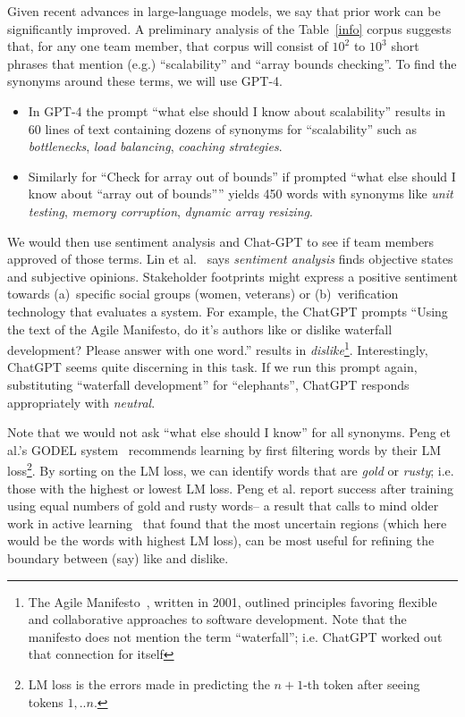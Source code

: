 \documentclass[twoside]{NSF}
\newenvironment{myitemize}
{ \begin{itemize}[topsep=0pt,itemsep=0pt,leftmargin=*]
    \setlength{\itemsep}{0pt}
    \setlength{\parskip}{0pt}
    \setlength{\parsep}{0pt}     }
{ \end{itemize}                  }
\newcommand{\bi}{\begin{myitemize}}
\newcommand{\ei}{\end{myitemize}}
\begin{document}
\begin{nsfdescription}
  Given recent advances in large-language models, we say that prior
work can be significantly improved.  A preliminary analysis of the Table~\ref{info}
corpus suggests that, for any one team member, that corpus will consist of $10^2$
to $10^3$ short phrases that mention (e.g.) ``scalability'' and ``array bounds checking''.
To find the synonyms around these terms, we will use GPT-4.
\bi 
\item In GPT-4 the prompt ``what else should I know about scalability'' results in 60 lines of text containing dozens of
synonyms for ``scalability'' such as {\em bottlenecks}, 
{\em load balancing}, {\em coaching strategies}.
\item 
Similarly for ``Check for array out of bounds'' if prompted
``what else should I know about ``array out of bounds''''
yields  450 words with   synonyms like
  {\em unit testing}, {\em memory corruption}, {\em dynamic array resizing}.
\ei
We would then use sentiment analysis and Chat-GPT to see if
team members approved of those terms.
Lin et al.~\cite{Lin18} says  
{\em sentiment analysis}  finds
objective states and subjective opinions.  
Stakeholder footprints   might    
express a positive sentiment  towards   (a)~specific  social groups (women, veterans) or
(b)~verification technology that evaluates
a system.
For example, the 
ChatGPT      prompts  
``Using the text of the Agile Manifesto, do it's authors like or dislike  waterfall development?  Please answer with one word.'' results in {\em dislike}\footnote{
The Agile Manifesto~\cite{beck2001agile}, written in 2001,  outlined principles favoring flexible and collaborative approaches to software development.
Note that the manifesto does not mention the term ``waterfall''; i.e. ChatGPT worked out that connection for itself}. Interestingly, ChatGPT seems quite discerning in this task. If we run this prompt again, substituting ``waterfall development'' for ``elephants'',
ChatGPT responds appropriately with {\em neutral}.

Note that we would not ask ``what else should I know'' for all synonyms.
 Peng et al.'s GODEL system~\cite{peng2022godel}
 recommends learning by   first filtering
words by their LM loss\footnote{LM loss is the   errors made in predicting
the $n+1$-th token after seeing tokens $1,..n$.}. By sorting  on the LM loss, we can
identify words that are {\em gold} or {\em rusty}; i.e. those with the highest or lowest LM loss. Peng et al. report success after training using equal numbers of gold and rusty words-- a  result that calls to mind older work in active learning~\cite{yu2019improving} that found that
the most uncertain regions (which here would be the words with highest LM loss),
can be most useful for refining the boundary between (say) like and dislike.
 


\end{nsfdescription}
\end{document}
